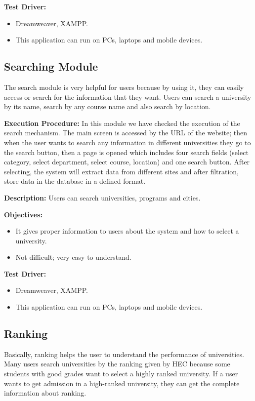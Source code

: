 \textbf{Test Driver:}
\begin{itemize}
    \item Dreamweaver, XAMPP.
    \item This application can run on PCs, laptops and mobile devices.
\end{itemize}

\subsection{Searching Module}

The search module is very helpful for users because by using it, they can easily access or search for the information that they want. Users can search a university by its name, search by any course name and also search by location.

\textbf{Execution Procedure:}
In this module we have checked the execution of the search mechanism. The main screen is accessed by the URL of the website; then when the user wants to search any information in different universities they go to the search button, then a page is opened which includes four search fields (select category, select department, select course, location) and one search button. After selecting, the system will extract data from different sites and after filtration, store data in the database in a defined format.

\textbf{Description:} Users can search universities, programs and cities.

\textbf{Objectives:}
\begin{itemize}
    \item It gives proper information to users about the system and how to select a university.
    \item Not difficult; very easy to understand.
\end{itemize}

\textbf{Test Driver:}
\begin{itemize}
    \item Dreamweaver, XAMPP.
    \item This application can run on PCs, laptops and mobile devices.
\end{itemize}

\subsection{Ranking}

Basically, ranking helps the user to understand the performance of universities. Many users search universities by the ranking given by HEC because some students with good grades want to select a highly ranked university. If a user wants to get admission in a high-ranked university, they can get the complete information about ranking.

